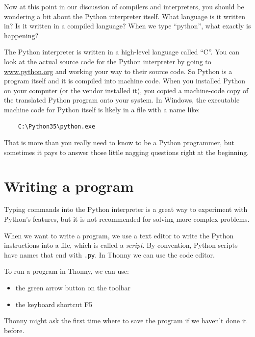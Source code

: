 Now at this point in our discussion of compilers and interpreters, you should be wondering a bit about the Python interpreter itself. What language is it written in? Is it written in a compiled language? When we type ``python'', what exactly is happening?

The Python interpreter is written in a high-level language called ``C''. You can look at the actual source code for the Python interpreter by going to \href{http://www.python.org}{www.python.org} and working your way to their source code. So Python is a program itself and it is compiled into machine code. When you installed Python on your computer (or the vendor installed it), you copied a machine-code copy of the translated Python program onto your system. In Windows, the executable machine code for Python itself is likely in a file with a name like:

\begin{verbatim}
    C:\Python35\python.exe
\end{verbatim}

That is more than you really need to know to be a Python programmer, but sometimes it pays to answer those little nagging questions right at the beginning.

\hypertarget{escribiendo-un-programa}{%
\section{Writing a program}\label{escribiendo-un-programa}}

Typing commands into the Python interpreter is a great way to experiment with Python's features, but it is not recommended for solving more complex problems.

When we want to write a program, we use a text editor to write the Python instructions into a file, which is called a \emph{script}. By convention, Python scripts have names that end with \texttt{.py}. In Thonny we can use the code editor.


To run a program in Thonny, we can use:

\begin{itemize}
    \item the green arrow button on the toolbar
    \item the keyboard shortcut F5
\end{itemize}
Thonny might ask the first time where to save the program if we haven't done it before.

